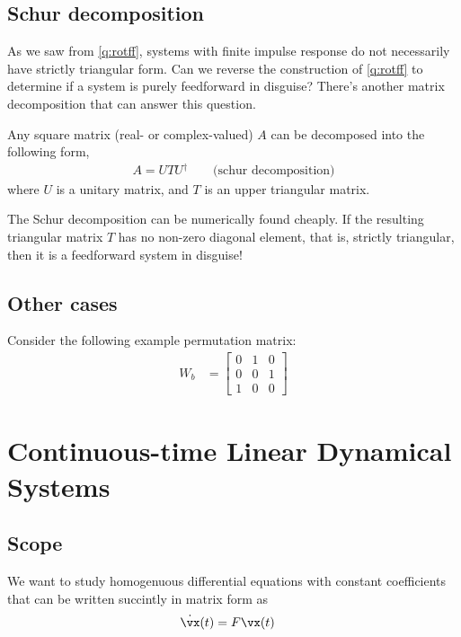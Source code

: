 \documentclass[a4paper,11pt]{exam}
\newcounter{ct}
\newcommand{\ctrp}{{^\dagger}} %
\begin{document}
\begin{questions}
\clearpage
\subsection{Schur decomposition}
As we saw from \ref{q:rotff}, systems with finite impulse response do not necessarily have strictly triangular form.
Can we reverse the construction of \ref{q:rotff} to determine if a system is purely feedforward in disguise?
There's another matrix decomposition that can answer this question.
\begin{tcolorbox}[colback=black!1!,title=Schur decomposition]
    Any square matrix (real- or complex-valued) $A$ can be decomposed into the following form,
    \begin{align}\label{eq:schur}
	A = U T U\ctrp \qquad \text{(schur decomposition)}
    \end{align}
    where $U$ is a unitary matrix, and $T$ is an upper triangular matrix.
\end{tcolorbox}
The Schur decomposition can be numerically found cheaply.
If the resulting triangular matrix $T$ has no non-zero diagonal element, that is, strictly triangular, then it is a feedforward system in disguise!

\subsection{Other cases}
Consider the following example permutation matrix:
\begin{align}\label{eq:nnm:ex:b}
W_b &=
\begin{bmatrix}
0 & 1 & 0\\
0 & 0 & 1\\
1 & 0 & 0
\end{bmatrix}
\end{align}

\newpage
\section{Continuous-time Linear Dynamical Systems}
\subsection{Scope}
We want to study homogenuous differential equations with constant coefficients that can be written succintly in matrix form as
\begin{align}
    \dot{\vx}(t) &= F \vx(t)
\end{align}

\end{questions}
\end{document}
